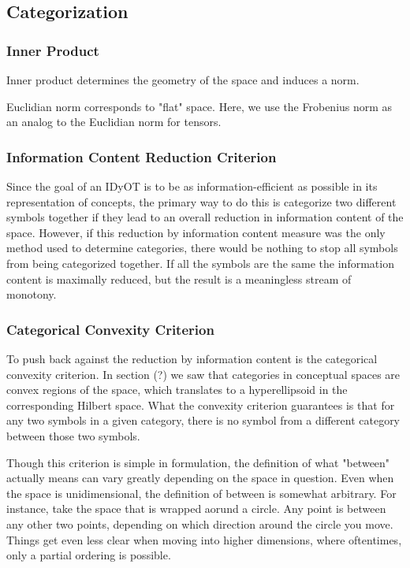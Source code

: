 \documentclass[runningheads]{llncs}
\begin{document}

\subsection{Categorization}

\subsubsection{Inner Product}
Inner product determines the geometry of the space and induces a norm.

Euclidian norm corresponds to "flat" space.  Here, we use the Frobenius norm as an analog to the Euclidian norm for tensors.

\subsubsection{Information Content Reduction Criterion} 
Since the goal of an IDyOT is to be as information-efficient as possible in its representation of concepts, the primary way to do this is categorize two different symbols together if they lead to an overall reduction in information content of the space.  However, if this reduction by information content measure was the only method used to determine categories, there would be nothing to stop all symbols from being categorized together.  If all the symbols are the same the information content is maximally reduced, but the result is a meaningless stream of monotony.

\subsubsection{Categorical Convexity Criterion}
To push back against the reduction by information content is the categorical convexity criterion.  In section (?) we saw that categories in conceptual spaces are convex regions of the space, which translates to a hyperellipsoid in the corresponding Hilbert space.  What the convexity criterion guarantees is that for any two symbols in a given category, there is no symbol from a different category between those two symbols.

Though this criterion is simple in formulation, the definition of what "between" actually means can vary greatly depending on the space in question.  Even when the space is unidimensional, the definition of between is somewhat arbitrary.  For instance, take the space that is wrapped aorund a circle.  Any point is between any other two points, depending on which direction around the circle you move.  Things get even less clear when moving into higher dimensions, where oftentimes, only a partial ordering is possible.
\end{document}

